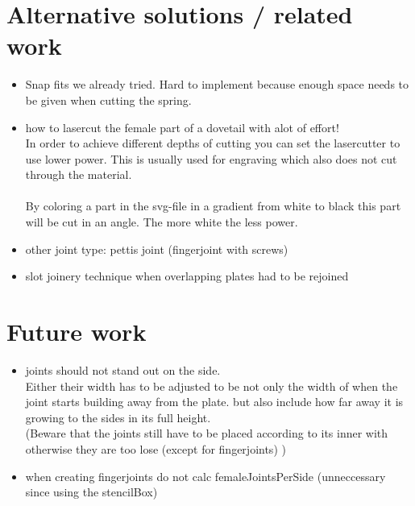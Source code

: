 \documentclass[../ClassicThesis.tex]{subfiles}
\begin{document}
\section{Alternative solutions / related work}
    \begin{itemize}
        \item Snap fits we already tried. Hard to implement because enough space needs to be given when cutting the spring.
        \item how to lasercut the female part of a dovetail with alot of effort!\\
        In order to achieve different depths of cutting you can set the lasercutter to use lower power. This is usually used for engraving which also does not cut through the material.\\  
        \\
        By coloring a part in the svg-file in a gradient from white to black this part will be cut in an angle. The more white the less power.
        \item other joint type: pettis joint (fingerjoint with screws)
        \item slot joinery technique when overlapping plates had to be rejoined
    \end{itemize}
    
    
    
\section{Future work}
    \begin{itemize}
        \item joints should not stand out on the side. \\
        Either their width has to be adjusted to be not only the width of when the joint starts building away from the plate. but also include how far away it is growing to the sides in its full height. \\
    (Beware that the joints still have to be placed according to its inner with otherwise they are too lose (except for fingerjoints) )
        \item when creating fingerjoints do not calc femaleJointsPerSide (unneccessary since using the stencilBox)
    \end{itemize}
\end{document}

